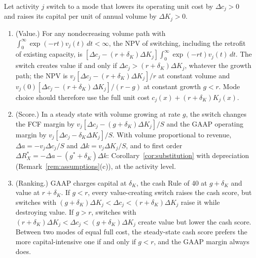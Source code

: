 \begin{proposition}\label{prop:tasks-capital}
Let activity $j$ switch to a mode that lowers its operating unit cost by $\Delta c_j>0$ and raises its capital per unit of annual volume by $\Delta K_j>0$.
\begin{enumerate}
\item[(a)] (Value.) For any nondecreasing volume path with $\int_0^\infty\exp(-rt)v_j(t)\,dt<\infty$, the NPV of switching, including the retrofit of existing capacity, is $[\Delta c_j-(r+\delta_K)\Delta K_j]\int_0^\infty\exp(-rt)v_j(t)\,dt$. The switch creates value if and only if $\Delta c_j>(r+\delta_K)\Delta K_j$, whatever the growth path; the NPV is $v_j[\Delta c_j-(r+\delta_K)\Delta K_j]/r$ at constant volume and $v_j(0)[\Delta c_j-(r+\delta_K)\Delta K_j]/(r-g)$ at constant growth $g<r$. Mode choice should therefore use the full unit cost $c_j(x)+(r+\delta_K)K_j(x)$.
\item[(b)] (Score.) In a steady state with volume growing at rate $g$, the switch changes the FCF margin by $v_j[\Delta c_j-(g+\delta_K)\Delta K_j]/S$ and the GAAP operating margin by $v_j[\Delta c_j-\delta_K\Delta K_j]/S$. With volume proportional to revenue, $\Delta a=-v_j\Delta c_j/S$ and $\Delta k=v_j\Delta K_j/S$, and to first order $\Delta R_X^*=-\Delta a-(g^*+\delta_K)\Delta k$: Corollary~\ref{cor:substitution} with depreciation (Remark~\ref{rem:assumptions}(c)), at the activity level.
\item[(c)] (Ranking.) GAAP charges capital at $\delta_K$, the cash Rule of 40 at $g+\delta_K$ and value at $r+\delta_K$. If $g<r$, every value-creating switch raises the cash score, but switches with $(g+\delta_K)\Delta K_j<\Delta c_j<(r+\delta_K)\Delta K_j$ raise it while destroying value. If $g>r$, switches with $(r+\delta_K)\Delta K_j<\Delta c_j<(g+\delta_K)\Delta K_j$ create value but lower the cash score. Between two modes of equal full cost, the steady-state cash score prefers the more capital-intensive one if and only if $g<r$, and the GAAP margin always does.
\end{enumerate}
\end{proposition}


